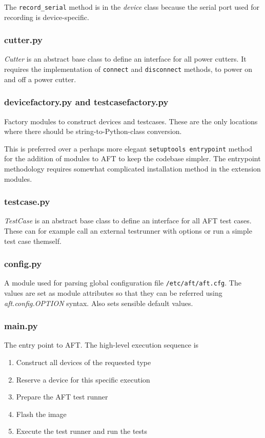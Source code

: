 \documentclass[a4paper,11pt]{article}
\newcommand{\cmd}[1]{\texttt{#1}}
\begin{document}
The \cmd{record\_serial} method is in the \emph{device} class because the serial port used for recording is device-specific.

\subsubsection*{cutter.py}
\emph{Cutter} is an abstract base class to define an interface for all power cutters. It requires the implementation of \cmd{connect} and \cmd{disconnect} methods, to power on and off a power cutter.

\subsubsection*{devicefactory.py and testcasefactory.py}
Factory modules to construct devices and testcases. These are the only locations where there should be string-to-Python-class conversion.

This is preferred over a perhaps more elegant \cmd{setuptools entrypoint} method for the addition of modules to AFT to keep the codebase simpler. The entrypoint methodology requires somewhat complicated installation method in the extension modules.

\subsubsection*{testcase.py}
\emph{TestCase} is an abstract base class to define an interface for all AFT test cases. These can for example call an external testrunner with options or run a simple test case themself.

\subsubsection*{config.py}
A module used for parsing global configuration file \cmd{/etc/aft/aft.cfg}. The values are set as module attributes so that they can be referred using \emph{aft.config.OPTION} syntax. Also sets sensible default values.

\subsubsection*{main.py}
The entry point to AFT. The high-level execution sequence is
\begin{enumerate}
\item Construct all devices of the requested type
\item Reserve a device for this specific execution
\item Prepare the AFT test runner
\item Flash the image
\item Execute the test runner and run the tests
\end{enumerate}
\end{document}
